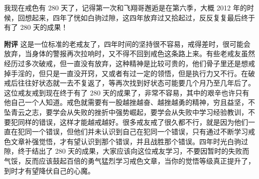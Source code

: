 \begin{case}
    我现在戒色有 280 天了，记得第一次和飞翔哥邂逅是在第六季，大概 2012 年的时候，回想起来，四年了恍如白驹过隙，这四年放弃过又拾起过，反反复复最后终于有了 280 天的成果！

    \textbf{附评} 这是一位标准的老戒友了，四年时间的坚持很不容易，戒得差时，很可能会放弃，当身体的警报再次拉响时，又不得不回到戒色这条路上来。有些老戒友虽然经历过多次破戒，但一直没有放弃，这种精神是比较可贵的，他们骨子里还是想戒掉手淫的，但只是一直没开窍，又或者有过一定的领悟，但是执行力又不行。在破戒后往往好状态就一去不复返了，等再次找到好状态可能要几个月乃至几年后了。这位戒友戒到现在终于有了 280 天的成果了，非常不容易，其中的艰辛也许只有他自己一个人知道。戒色就需要有一股越挫越奋、越挫越勇的精神，穷且益坚，不坠青云之志，要学会从失败的挫折中强势崛起，要学会从失败中学习经验教训，不要犯同样的错误，这样才能越戒越好。很多戒友戒了很久都不行，就是因为他们一直在犯同一个错误，但他们并未认识到自己在犯同一个错误，只有通过不断学习戒色文章补强觉悟，才有望认识到那个错误，并且战胜那个错误。四年时光白驹过隙，终于结出了 280 天的成果，大家应该向这位戒友学习，不要因暂时的失败而气馁，反而应该鼓起百倍的勇气猛烈学习戒色文章，当你的觉悟等级真正提升了，到时才有望降伏自己的心魔。
\end{case}

